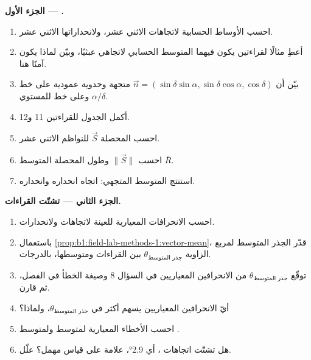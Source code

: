 \begin{problem}
\medskip
\noindent\textbf{الجزء الأول --- .}
\begin{enumerate}
  \item احسب الأوساط الحسابية لاتجاهات  الاثني عشر، ولانحداراتها الاثني عشر.
  \item أعطِ مثالًا لقراءتين يكون فيهما المتوسط الحسابي لاتجاهي  عبثيًا، وبيّن لماذا يكون آمنًا هنا.
  \item بيّن أن $\vec n = (\sin\delta\sin\alpha, \sin\delta\cos\alpha,
        \cos\delta)$ متجهة وحدوية عمودية على خط  وعلى خط  للمستوي $\alpha/\delta$.
  \item أكمل الجدول للقراءتين 11 و12.
  \item احسب المحصلة $\vec S$ للنواظم الاثني عشر.
  \item احسب $\|\vec S\|$ وطول المحصلة المتوسط $\bar R$.
  \item استنتج المتوسط المتجهي: اتجاه انحداره وانحداره.
\end{enumerate}

\medskip
\noindent\textbf{الجزء الثاني --- تشتّت القراءات.}
\begin{enumerate}[resume]
  \item احسب الانحرافات المعيارية للعينة لاتجاهات  ولانحدارات.
  \item باستعمال \cref{prop:b1:field-lab-methods-1:vector-mean}، قدّر الجذر المتوسط لمربع الزاوية $\theta_{\text{جذر المتوسط}}$ بين القراءات ومتوسطها، بالدرجات.
  \item توقّع $\theta_{\text{جذر المتوسط}}$ من الانحرافين المعياريين في السؤال 8 وصيغة الخطأ في الفصل، ثم قارن.
  \item أيّ الانحرافين المعياريين يسهم أكثر في $\theta_{\text{جذر المتوسط}}$، ولماذا؟
  \item احسب الأخطاء المعيارية لمتوسط  ولمتوسط .
  \item هل تشتّت اتجاهات ، أي \ang{2.9}، علامة على قياس مهمل؟ علّل.
\end{enumerate}


\end{problem}
